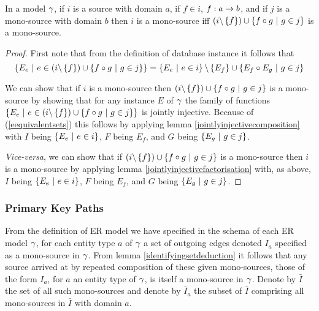 \begin{lemma}

In a model $\gamma$, if $i$ is a source with domain $a$,
if $f \in i$, $f: a \rightarrow b$, and if $j$ is a mono-source with domain $b$ then 
$i$ is a mono-source iff $(i \backslash \left\{f\right\}) \cup \left\{f \circ g \ \middle|\ g \in j\right\}$ is a mono-source.
\end{lemma}
\begin{proof}
First note that from the definition of database instance it follows that 
\begin{equation}
\label{eequivalentsets}
\left\{E_e \ \middle|\ e \in (i \backslash \left\{f\right\}) \cup \left\{f \circ g \ \middle|\ g \in j\right\}\right\}
= \left\{E_e \ \middle|\ e \in i\right\} \backslash \left\{E_f\right\} \cup \left\{E_f \circ E_g \ \middle|\ g \in j\right\}
\end{equation}

We can show that if $i$ is a mono-source 
then $(i \backslash \left\{f\right\}) \cup \left\{f \circ g \ \middle|\ g \in j\right\}$ is a mono-source
by showing that for any instance $E$ of $\gamma$ the family of functions 
$\left\{E_e \ \middle|\ e \in (i \backslash \left\{f\right\}) \cup \left\{f \circ g \ \middle|\ g \in j\right\}\right\}$
is jointly injective. Because of (\ref{eequivalentsets}) this follows by applying lemma \ref{jointlyinjectivecomposition} with $I$ being $\left\{E_e \ \middle|\ e \in i\right\}$,
$F$ being $E_f$,  and $G$ being $\left\{E_g \ \middle|\ g \in j\right\}$.

\textit{Vice-versa}, we can show that if $(i \backslash \left\{f\right\}) \cup \left\{f \circ g \ \middle|\ g \in j\right\}$ is a mono-source then $i$ is a mono-source by applying lemma \ref{jointlyinjectivefactorisation} 
with, as above, $I$ being $\left\{E_e \ \middle|\ e \in i\right\}$,
$F$ being $E_f$,  and $G$ being $\left\{E_g \ \middle|\ g \in j\right\}$.
\end{proof}



\subsubsection{Primary Key Paths }

From the definition of ER model we have specified in the schema of each ER model $\gamma$, for each entity type $a$ of $\gamma$ a set of outgoing edges denoted $I_a$ specified as a mono-source in $\gamma$. From lemma \ref{identifyingsetdeduction} it follows that any source arrived at by repeated composition of these given mono-sources, those of the form $I_a$, for $a$ an entity type of $\gamma$, is itself a mono-source in $\gamma$. 
Denote by $\bar{I}$ the set  of all such mono-sources and denote by $\bar{I}_a$ the subset of $\bar{I}$ comprising all mono-sources in $\bar{I}$ with domain $a$.

